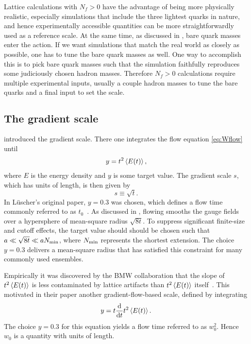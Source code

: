 Lattice calculations with $N_f>0$ have the
advantage of being more physically realistic, especially simulations that
include the three lightest quarks in nature, and hence experimentally accessible
quantities can be more straightforwardly used as a reference scale. At the same
time, as discussed in , bare quark masses enter the action.
If we want simulations that match the real world as closely as possible, one has
to tune the bare quark masses as well. One way to accomplish this is to pick
bare quark masses such that the simulation faithfully reproduces some
judiciously chosen hadron masses. Therefore $N_f>0$ calculations require
multiple experimental inputs, usually a couple hadron masses to tune the bare
quarks and a final input to set the scale. 

\subsection{The gradient scale}

 introduced the gradient scale. There one integrates the
flow equation \eqref{eq:Wflow} until
\begin{equation}
  y=t^2 \ev{E(t)},
\end{equation}
where $E$ is the energy density and 
$y$ is some target value. The gradient scale $s$, which has units of length,
is then given by
\begin{equation}
  s\equiv\sqrt{t}.
\end{equation}
In L\"uscher's original paper, $y=0.3$ was chosen, which defines a flow time
commonly referred to as $t_0$~\cite{luscher_properties_2010}. As discussed
in , flowing smooths the gauge fields over a hypersphere of
mean-square radius $\sqrt{8t}$. To suppress significant finite-size and cutoff effects,
the target value should should be chosen such that $a\ll \sqrt{8t}\ll aN_{\rm
min}$, where $N_{\rm min}$ represents the shortest extension. The choice $y=0.3$
delivers a mean-square radius that has satisfied this constraint for many
commonly used ensembles.

Empirically it was discovered by the BMW collaboration that the slope of
$t^2\ev{E(t)}$ is less contaminated by lattice artifacts than $t^2\ev{E(t)}$
itself~\cite{BMW:2012hcm}. This motivated in their paper another
gradient-flow-based scale, defined by integrating 
\begin{equation}
  y=t \dv{}{t}t^2 \ev{E(t)}.
\end{equation}
The choice $y=0.3$ for this equation yields a flow time referred to as $w_0^2$.
Hence $w_0$ is a quantity with units of length.

